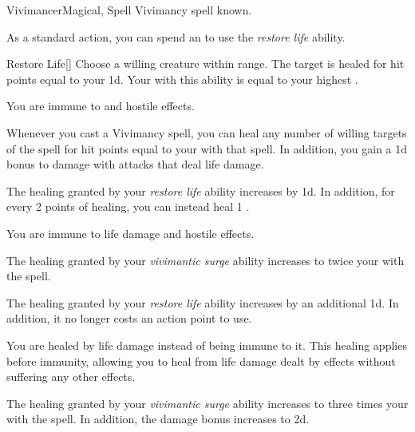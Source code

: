     \begin{feat}{Vivimancer}{Magical, Spell}
        \featpre Vivimancy spell known.

         As a standard action, you can spend an  to use the \textit{restore life} ability.
        \begin{ability}{Restore Life}[]
            Choose a willing creature within \rngmed range.
            The target is healed for hit points equal to your  \plus1d.
            Your  with this ability is equal to your highest .
        \end{ability}

         You are immune to  and hostile  effects.

         Whenever you cast a Vivimancy spell, you can heal any number of willing targets of the spell for hit points equal to your  with that spell.
        In addition, you gain a \plus1d bonus to damage with attacks that deal life damage.

         The healing granted by your \textit{restore life} ability increases by \plus1d.
        In addition, for every 2 points of healing, you can instead heal 1 .

         You are immune to life damage and hostile  effects.

         The healing granted by your \textit{vivimantic surge} ability increases to twice your  with the spell.

         The healing granted by your \textit{restore life} ability increases by an additional \plus1d.
        In addition, it no longer costs an action point to use.

         You are healed by life damage instead of being immune to it.
        This healing applies before immunity, allowing you to heal from life damage dealt by  effects without suffering any other effects.

         The healing granted by your \textit{vivimantic surge} ability increases to three times your  with the spell.
        In addition, the damage bonus increases to \plus2d.

        \ff[19]{} 
    \end{feat}

